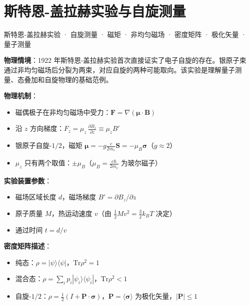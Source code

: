 
\section{斯特恩-盖拉赫实验与自旋测量}
\label{sec:stern-gerlach}

\begin{tipbox}[关键词标签]
斯特恩-盖拉赫实验 · 自旋测量 · 磁矩 · 非均匀磁场 · 密度矩阵 · 极化矢量 · 量子测量
\end{tipbox}

\begin{modelbox}[模型：自旋-$1/2$ 在非均匀磁场中的偏转]
\textbf{物理情境}：1922 年斯特恩-盖拉赫实验首次直接证实了电子自旋的存在。银原子束通过非均匀磁场后分裂为两束，对应自旋的两种可能取向。该实验是理解量子测量、态叠加和自旋物理的基础范例。

\textbf{物理机制}：
\begin{itemize}[nosep]
    \item 磁偶极子在非均匀磁场中受力：$\mathbf{F}=\nabla(\boldsymbol{\mu}\cdot\mathbf{B})$
    \item 沿 $z$ 方向梯度：$F_z=\mu_z\,\frac{\partial B_z}{\partial z}\equiv\mu_z B'$
    \item 银原子自旋-$1/2$，磁矩 $\boldsymbol{\mu}=-g\frac{e}{2m_e}\mathbf{S}=-\mu_B\boldsymbol{\sigma}$（$g\approx2$）
    \item $\mu_z$ 只有两个取值：$\pm\mu_B$（$\mu_B=\frac{e\hbar}{2m_e}$ 为玻尔磁子）
\end{itemize}

\textbf{实验装置参数}：
\begin{itemize}[nosep]
    \item 磁场区域长度 $d$，磁场梯度 $B'=\partial B_z/\partial z$
    \item 原子质量 $M$，热运动速度 $v$（由 $\frac12Mv^2=\frac32k_BT$ 决定）
    \item 通过时间 $t=d/v$
\end{itemize}

\textbf{密度矩阵描述}：
\begin{itemize}[nosep]
    \item 纯态：$\rho=|\psi\rangle\langle\psi|$，$\text{Tr}\rho^2=1$
    \item 混合态：$\rho=\sum_i p_i|\psi_i\rangle\langle\psi_i|$，$\text{Tr}\rho^2<1$
    \item 自旋-$1/2$：$\rho=\frac12(I+\mathbf{P}\cdot\boldsymbol{\sigma})$，$\mathbf{P}=\langle\boldsymbol{\sigma}\rangle$ 为极化矢量，$|\mathbf{P}|\leq1$
\end{itemize}
\end{modelbox}

